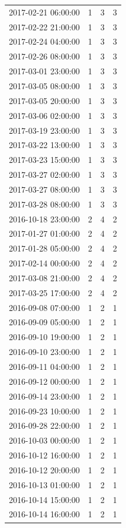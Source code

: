 \begin{tabular}{lrrr}
2017-02-21 06:00:00 & 1 & 3 & 3 \\
2017-02-22 21:00:00 & 1 & 3 & 3 \\
2017-02-24 04:00:00 & 1 & 3 & 3 \\
2017-02-26 08:00:00 & 1 & 3 & 3 \\
2017-03-01 23:00:00 & 1 & 3 & 3 \\
2017-03-05 08:00:00 & 1 & 3 & 3 \\
2017-03-05 20:00:00 & 1 & 3 & 3 \\
2017-03-06 02:00:00 & 1 & 3 & 3 \\
2017-03-19 23:00:00 & 1 & 3 & 3 \\
2017-03-22 13:00:00 & 1 & 3 & 3 \\
2017-03-23 15:00:00 & 1 & 3 & 3 \\
2017-03-27 02:00:00 & 1 & 3 & 3 \\
2017-03-27 08:00:00 & 1 & 3 & 3 \\
2017-03-28 08:00:00 & 1 & 3 & 3 \\
2016-10-18 23:00:00 & 2 & 4 & 2 \\
2017-01-27 01:00:00 & 2 & 4 & 2 \\
2017-01-28 05:00:00 & 2 & 4 & 2 \\
2017-02-14 00:00:00 & 2 & 4 & 2 \\
2017-03-08 21:00:00 & 2 & 4 & 2 \\
2017-03-25 17:00:00 & 2 & 4 & 2 \\
2016-09-08 07:00:00 & 1 & 2 & 1 \\
2016-09-09 05:00:00 & 1 & 2 & 1 \\
2016-09-10 19:00:00 & 1 & 2 & 1 \\
2016-09-10 23:00:00 & 1 & 2 & 1 \\
2016-09-11 04:00:00 & 1 & 2 & 1 \\
2016-09-12 00:00:00 & 1 & 2 & 1 \\
2016-09-14 23:00:00 & 1 & 2 & 1 \\
2016-09-23 10:00:00 & 1 & 2 & 1 \\
2016-09-28 22:00:00 & 1 & 2 & 1 \\
2016-10-03 00:00:00 & 1 & 2 & 1 \\
2016-10-12 16:00:00 & 1 & 2 & 1 \\
2016-10-12 20:00:00 & 1 & 2 & 1 \\
2016-10-13 01:00:00 & 1 & 2 & 1 \\
2016-10-14 15:00:00 & 1 & 2 & 1 \\
2016-10-14 16:00:00 & 1 & 2 & 1 \\

\end{tabular}
